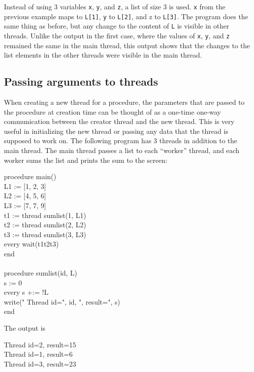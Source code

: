 \noindent
Instead of using 3 variables \texttt{x}, \texttt{y}, and \texttt{z}, a
list of size 3 is used. \texttt{x} from the previous example maps to
\texttt{L[1]}, \texttt{y} to \texttt{L[2]}, and z to
\texttt{L[3]}. The program does the same thing as before, but any
change to the content of \texttt{L} is visible in other
threads. Unlike the output in the first case, where the values of
\texttt{x}, \texttt{y}, and \texttt{z} remained the same in the main
thread, this output shows that the changes to the list elements in the
other threads were visible in the main thread.

\subsection{Passing arguments to threads}

When creating a new thread for a procedure, the parameters that are
passed to the procedure at creation time can be thought of as a
one-time one-way communication between the creator thread and the new
thread. This is very useful in initializing the new thread or passing
any data that the thread is supposed to work on. The following program
has 3 threads in addition to the main thread. The main thread passes a
list to each ``worker'' thread, and each worker sums the list and
prints the sum to the screen:

\begin{icode}
procedure main() \\
\>   L1 := [1, 2, 3] \\
\>   L2 := [4, 5, 6] \\
\>   L3 := [7, 7, 9] \\
\>   t1 := thread sumlist(1, L1) \\
\>   t2 := thread sumlist(2, L2) \\
\>   t3 := thread sumlist(3, L3) \\
\>   every wait(t1{\textbar}t2{\textbar}t3) \\
end \\
\\
procedure sumlist(id, L) \\
\>   s := 0 \\
\>   every s +:= !L \\
\>   write(" Thread id=", id, ", result=", s) \\
end
\end{icode}
The output is
\begin{icode}
Thread id=2, result=15 \\
Thread id=1, result=6 \\
Thread id=3, result=23
\end{icode}

